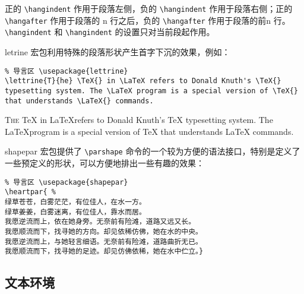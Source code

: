 正的 \verb|\hangindent| 作用于段落左侧，负的 \verb|\hangindent| 作用于段落右侧；正的 \verb|\hangafter|
作用于段落的 n 行之后，负的 \verb|\hangafter| 作用于段落的前n 行。\verb|\hangindent| 和 \verb|\hangindent| 的设置只对当前段起作用。

letrine 宏包利用特殊的段落形状产生首字下沉的效果，例如：

\begin{minipage}[t]{0.45\textwidth}
\begin{lstlisting}
% 导言区 \usepackage{lettrine}
\lettrine{T}{he} \TeX{} in \LaTeX refers to Donald Knuth's \TeX{} typesetting system. The \LaTeX program is a special version of \TeX{} that understands \LaTeX{} commands.
\end{lstlisting}
\end{minipage}
\hfill
\begin{minipage}[t]{0.45\textwidth}
    \lettrine{T}{he} \TeX{} in \LaTeX refers to Donald Knuth's \TeX{} typesetting system. The \LaTeX program is a special version of \TeX{} that understands \LaTeX{} commands.
\end{minipage}

shapepar 宏包提供了 \verb|\parshape| 命令的一个较为方便的语法接口，特别是定义了一些预定义的形状，可以方便地排出一些有趣的效果：

\begin{minipage}[t]{0.45\textwidth}
\begin{lstlisting}
% 导言区 \usepackage{shapepar}
\heartpar{ %
绿草苍苍，白雾茫茫，有位佳人，在水一方。
绿草姜姜，白雾迷离，有位佳人，靠水而居。
我愿逆流而上，依在她身旁。无奈前有险滩，道路又远又长。
我愿顺流而下，找寻她的方向。却见依稀仿佛，她在水的中央。
我愿逆流而上，与她轻言细语。无奈前有险滩，道路曲折无已。
我愿顺流而下，找寻她的足迹。却见仿佛依稀，她在水中伫立。}
\end{lstlisting}
\end{minipage}
\hfill
\begin{minipage}[t]{0.45\textwidth}
\end{minipage}

\subsection{文本环境}


